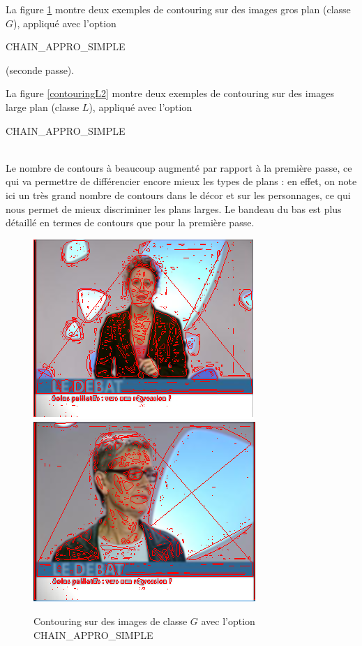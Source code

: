\documentclass{book}
\begin{document}
La figure \ref{contouringG2} montre deux exemples de contouring sur des images \og gros plan \fg{} (classe $G$), appliqué
avec l'option \begin{itshape}CHAIN\_APPRO\_SIMPLE\end{itshape} (seconde passe).

La figure \ref{contouringL2} montre deux 
exemples de contouring sur des images \og large plan \fg{} (classe $L$), appliqué avec 
l'option \begin{itshape}CHAIN\_APPRO\_SIMPLE\end{itshape}\\


Le nombre de contours à beaucoup augmenté par rapport à la première passe, ce qui va permettre de différencier encore mieux 
les types de plans : en effet, on note ici un très grand nombre de contours dans le décor et sur les personnages, ce qui nous permet de 
mieux discriminer les plans larges.
Le bandeau du bas est plus détaillé en termes de contours que pour la première passe.

\begin{figure}[H]
\begin{center}
\includegraphics[scale=0.5]{contouring_exemple1_classeG_passe2.png}
\includegraphics[scale=0.5]{contouring_exemple2_classeG_passe2.png}
\end{center}
\caption{Contouring sur des images de classe $G$ avec l'option CHAIN\_APPRO\_SIMPLE}
\label{contouringG2}
\end{figure}
\end{document}
